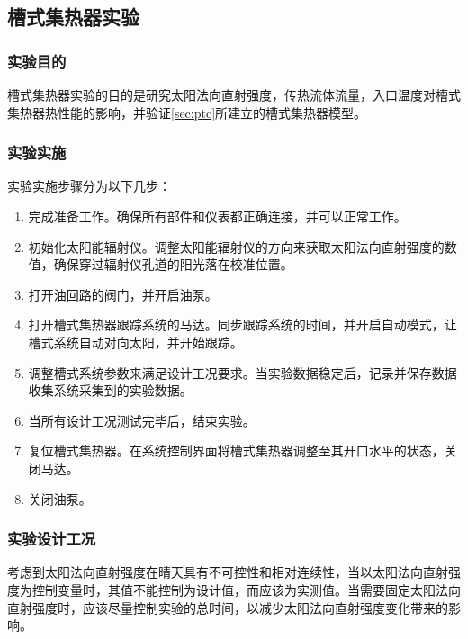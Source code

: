 \subsection{槽式集热器实验}
\subsubsection{实验目的}
槽式集热器实验的目的是研究太阳法向直射强度，传热流体流量，入口温度对槽式集热器热性能的影响，并验证\autoref{sec:ptc}所建立的槽式集热器模型。

\subsubsection{实验实施}
实验实施步骤分为以下几步：
\begin{enumerate}[label=(\arabic*)]
	\item 完成准备工作。确保所有部件和仪表都正确连接，并可以正常工作。
	\item 初始化太阳能辐射仪。调整太阳能辐射仪的方向来获取太阳法向直射强度的数值，确保穿过辐射仪孔道的阳光落在校准位置。
	\item 打开油回路的阀门，并开启油泵。
	\item 打开槽式集热器跟踪系统的马达。同步跟踪系统的时间，并开启自动模式，让槽式系统自动对向太阳，并开始跟踪。
	\item 调整槽式系统参数来满足设计工况要求。当实验数据稳定后，记录并保存数据收集系统采集到的实验数据。
	\item 当所有设计工况测试完毕后，结束实验。
	\item 复位槽式集热器。在系统控制界面将槽式集热器调整至其开口水平的状态，关闭马达。
	\item 关闭油泵。
\end{enumerate}

\subsubsection{实验设计工况}

考虑到太阳法向直射强度在晴天具有不可控性和相对连续性，当以太阳法向直射强度为控制变量时，其值不能控制为设计值，而应该为实测值。当需要固定太阳法向直射强度时，应该尽量控制实验的总时间，以减少太阳法向直射强度变化带来的影响。

